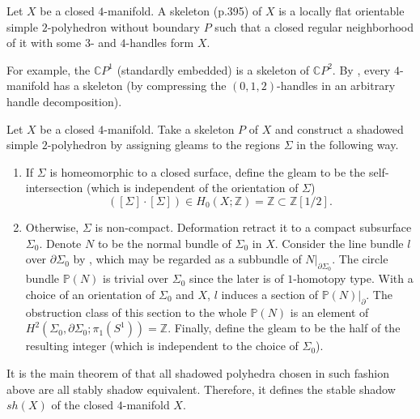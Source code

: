 \begin{definition}\label{def/skeleton-of-a-4-manifold}
  Let $X$ be a closed $4$-manifold. A skeleton (p.395) of $X$ is
  a locally flat orientable simple $2$-polyhedron without
  boundary $P$ such that a closed regular neighborhood of it with
  some $3$- and $4$-handles form $X$.
\end{definition}

\noindent For example, the $\mathbb{C}P^{1}$ (standardly
embedded) is a skeleton of $\mathbb{C}P^{2}$. By \cite[theorem
IX.1.5]{turaev-qiok-3-manifolds}, every $4$-manifold has a
skeleton (by compressing the $(0,1,2)$-handles in an arbitrary
handle decomposition).

\begin{definition}\label{def/stable-shadow-of-a-4-manifold}
  Let $X$ be a closed $4$-manifold. Take a skeleton $P$ of $X$
  and construct a shadowed simple $2$-polyhedron by assigning
  gleams to the regions $\Sigma$ in the following way.
  \begin{enumerate}
    \item If $\Sigma$ is homeomorphic to a closed surface, define
          the gleam to be the self-intersection (which is
          independent of the orientation of $\Sigma$)
          $$([\Sigma] \cdot [\Sigma]) \in H_{0}(X;\mathbb{Z}) = \mathbb{Z} \subset \mathbb{Z}\left[1/2\right].$$
    \item Otherwise, $\Sigma$ is non-compact. Deformation retract
          it to a compact subsurface $\Sigma_{0}$. Denote $N$ to
          be the normal bundle of $\Sigma_{0}$ in $X$. Consider
          the line bundle $l$ over $\partial \Sigma_{0}$ by
          \cite[section VIII.6.2,
          p.397]{turaev-qiok-3-manifolds}, which may be regarded
          as a subbundle of $N|_{\partial \Sigma_{0}}$. The
          circle bundle $\mathbb{P}(N)$ is trivial over
          $\Sigma_{0}$ since the later is of $1$-homotopy type.
          With a choice of an orientation of $\Sigma_{0}$ and
          $X$, $l$ induces a section of
          $\mathbb{P}(N)|_{\partial}$. The obstruction class of
          this section to the whole $\mathbb{P}(N)$ is an element
          of
          $H^{2}(\Sigma_{0}, \partial \Sigma_{0}; \pi_{1}(S^{1})) = \mathbb{Z}$.
          Finally, define the gleam to be the half of the
          resulting integer (which is independent to the choice
          of $\Sigma_{0}$).
  \end{enumerate}
  It is the main theorem of \cite[section
  IX.1.7]{turaev-qiok-3-manifolds} that all shadowed polyhedra
  chosen in such fashion above are all stably shadow equivalent.
  Therefore, it defines the stable shadow $sh(X)$ of the closed
  $4$-manifold $X$.
\end{definition}

